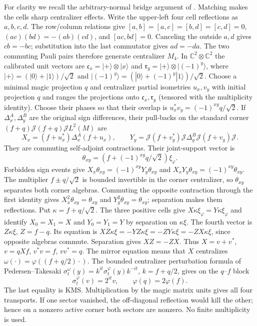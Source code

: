 For clarity we recall the arbitrary-normal bridge argument of
\cite[Lemma 2.2]{ReadType}. Matching makes the cells sharp centralizer
effects. Write the upper-left four cell reflections as $a,b,c,d$.
The row/column relations give
$[a,b]=[a,c]=[b,d]=[c,d]=0$,
$(ac)(bd)=-(ab)(cd)$, and $[ac,bd]=0$.
Canceling the outside $a,d$ gives $cb=-bc$; substitution into the
last commutator gives $ad=-da$.
The two commuting Pauli pairs therefore generate centralizer $M_4$.
In $\mathbb C^2\otimes\mathbb C^2$ the calibrated unit vectors are
$\mathfrak c_x=|+\rangle\otimes|x\rangle$ and
$\mathfrak r_y=|+\rangle\otimes|(-1)^y\rangle$, where
$|+\rangle=(|0\rangle+|1\rangle)/\sqrt2$ and
$|(-1)^y\rangle=(|0\rangle+(-1)^y|1\rangle)/\sqrt2$.
Choose a minimal magic projection $q$ and centralizer partial
isometries $u_x,v_y$ with initial projection $q$ and ranges the
projections onto $\mathfrak c_x,\mathfrak r_y$ (tensored with the
multiplicity identity). Choose their phases so that their overlap is
$u_x^*v_y=(-1)^{xy}q/\sqrt2$.
If $\Delta_x^A,\Delta_y^B$ are the original sign differences,
their pull-backs on the standard corner
$(f+q)\mathcal J(f+q)\mathcal J L^2(M)$ are
\[
 X_x=(f+u_x^*)\Delta_x^A(f+u_x),\qquad
 Y_y=\mathcal J(f+v_y^*)\mathcal J\Delta_y^B \mathcal J(f+v_y)\mathcal J.
\]
They are commuting self-adjoint contractions.
Their joint-support vector is
\[
 \theta_{xy}=(f+(-1)^{xy}q/\sqrt2)\xi_\varphi .
\]
Forbidden sign events give
$X_x\theta_{xy}=(-1)^{xy}Y_y\theta_{xy}$ and
$X_xY_y\theta_{xy}=(-1)^{xy}\theta_{xy}$.
The multiplier $f\pm q/\sqrt2$ is bounded invertible in the corner
centralizer, so $\theta_{xy}$ separates both corner algebras.
Commuting the opposite contraction through the first identity gives
$X_x^2\theta_{xy}=\theta_{xy}$ and $Y_y^2\theta_{xy}=\theta_{xy}$;
separation makes them reflections.
Put $\kappa=f+q/\sqrt2$. The three positive cells give
$X\kappa\xi_\varphi=Y\kappa\xi_\varphi$ and identify
$X_0=X_1=X$ and $Y_0=Y_1=Y$
by separation on $\kappa\xi$. The fourth vector is $Z\kappa\xi$, $Z=f-q$.
Its equation is $XZ\kappa\xi=-YZ\kappa\xi=-ZY\kappa\xi=-ZX\kappa\xi$,
since opposite algebras commute. Separation gives $XZ=-ZX$.
Thus $X=v+v^*$, $v=qXf$, $v^*v=f$, $vv^*=q$.
The mirror equation means that $X$ centralizes
$\omega(\cdot)=\varphi((f+q/2)\cdot)$.
The bounded centralizer perturbation formula of Pedersen--Takesaki \cite[Lemma 4.5]{PT}
$\sigma_t^\omega(y)=k^{it}\sigma_t^\varphi(y)k^{-it}$,
$k=f+q/2$, gives on the $q$--$f$ block
\begin{equation}\label{eq:bridge}
 \sigma_t^\varphi(v)=2^{it}v,\qquad \varphi(q)=2\varphi(f).
\end{equation}
The last equality is KMS. Multiplication by the magic matrix units
gives all four transports. If one sector vanished, the off-diagonal
reflection would kill the other; hence on a nonzero active corner
both sectors are nonzero. No finite multiplicity is used.


